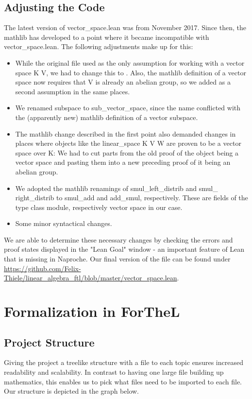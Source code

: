 \documentclass[11pt]{article}
\begin{document}
\subsection{Adjusting the Code}
The latest version of vector\_space.lean was from November 2017. Since then, the mathlib has developed to a point where it became incompatible with vector\_space.lean.
The following adjustments make up for this:
\begin{itemize}
\item While the original file used {\ftl [field K]} as the only assumption for working with a {\ftl vector space K V}, we had to change this to {}. Also, the mathlib definition of a vector space now requires that {\ftl V} is already an abelian group, so we added {} as a second assumption in the same places.
\item We renamed {\lean subspace} to {\lean sub\_vector\_space}, since the name conflicted with the (apparently new) mathlib definition of a vector subspace.
\item The mathlib change described in the first point also demanded changes in places where objects like the {\lean linear\_space K V W} are proven to be a vector space over K: We had to cut parts from the old proof of the object being a vector space and pasting them into a new preceding proof of it being an abelian group. 
\item We adopted the mathlib renamings of {\lean smul\_left\_distrib} and {\lean smul\_ right\_distrib} to {\lean smul\_add} and {\lean add\_smul}, respectively. These are fields of the type class {\lean module}, respectively {\lean vector space} in our case.
\item Some minor syntactical changes.
\end{itemize}
We are able to determine these necessary changes by checking the errors and proof states displayed in the "Lean Goal" window - an important feature of Lean that is missing in Naproche. Our final version of the file can be found under \url{https://github.com/Felix-Thiele/linear_algebra_ftl/blob/master/vector_space.lean}.



\newpage
\lstset{style=ftl}
\section{Formalization in ForTheL}
\subsection{Project Structure}
Giving the project a treelike structure with a file to each topic ensures increased readability and scalability. 
In contrast to having one large file building up mathematics, this enables us to pick what files need to be imported to each file. 
Our structure is depicted in the graph below.
\end{document}
